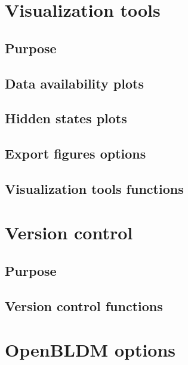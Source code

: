 \documentclass{article}
\begin{document}
\section{Visualization tools}
\subsection{Purpose}
\subsection{Data availability plots}
\subsection{Hidden states plots}
\subsection{Export figures options}
\subsection{Visualization tools functions}
\newpage


\section{Version control}
\subsection{Purpose}
\subsection{Version control functions}
\newpage

\section{OpenBLDM options}
\end{document}
